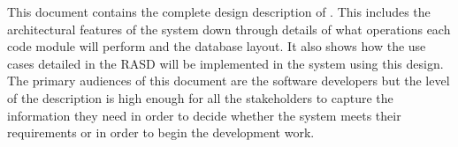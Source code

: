 This document contains the complete design description of \PowerEnJoy{}. This includes the architectural features of the system down through details of what operations each code module will perform and the database layout. It also shows how the use cases detailed in the RASD will be implemented in the system using this design. The primary audiences of this document are the software developers but the level of the description is high enough for all the stakeholders to capture the information they need in order to decide whether the system meets their requirements or in order to begin the development work.

